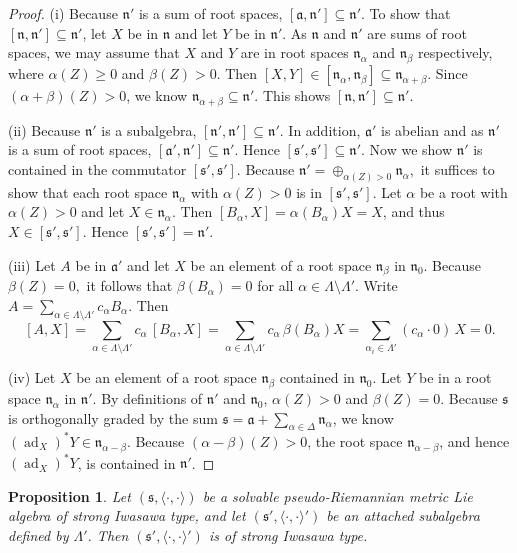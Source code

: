 \documentclass[12pt]{amsart}
\newcommand{\fraka}{\ensuremath{\mathfrak{a}} }
\newcommand{\frakn}{\ensuremath{\mathfrak{n}} }
\newcommand{\fraks}{\ensuremath{\mathfrak{s}} }
\renewcommand\a{{\mathfrak{a}}}
\newcommand\n{{\mathfrak{n}}}
\newcommand\s{{\mathfrak{s}}}
\newcommand\ip{{\langle\cdot {,} \cdot\rangle}}
\newcommand\ad{\operatorname{ad}}
\theoremstyle{plain}
\newtheorem{prop}[theorem]{Proposition}
\theoremstyle{definition}
\theoremstyle{remark}
\numberwithin{equation}{section}
\numberwithin{theorem}{section}
\begin{document}
\begin{proof}
(i) Because  $\frakn'$ is
a sum of root spaces, $[\a,\n']\subseteq \n'$. To show that
$[\n,\n']\subseteq \n'$, let $X$ be in $\frakn$ and let $Y$ be in
$\frakn'$.  As $\frakn$ and $\frakn'$ are sums of root spaces, we may
assume  that $X$ and $Y$ are in root spaces
$\n_{\alpha}$ and $\n_{\beta}$ respectively, where $\alpha(Z)\geq 0$ and $\beta(Z)>0$. 
 Then $[X,Y] \in [\frakn_\alpha, \frakn_\beta]
\subseteq \frakn_{\alpha+\beta}$.
Since $(\alpha+\beta)(Z)>0$, we know 
$\frakn_{\alpha+\beta} \subseteq \frakn'$. This shows $[\n,\n']\subseteq \n'$.

(ii) Because $\frakn'$ is a
subalgebra,  $[\n',\n']\subseteq \frakn'$. In addition, $\fraka'$ is abelian and as $\frakn'$ is a sum of root spaces, $[\fraka',\frakn'] \subseteq \frakn'$.
Hence $[\s',\s'] \subseteq \frakn'$.
Now we show $\n'$ is contained in the commutator $[\fraks',\fraks']$. Because
$\n' = \oplus_{\alpha(Z)>0} \frakn_\alpha,$ it suffices to show that each root space
$\n_{\alpha}$ with $\alpha(Z) >0$ is in $[\fraks',\fraks']$.  Let
$\alpha$ be a root with $\alpha(Z)>0$ and let $X\in \n_\alpha$.  Then
$[B_\alpha,X] =\alpha(B_\alpha)X =X$, 
and
thus $X \in [\s',\s']$. 
Hence $[\fraks', \fraks'] = \frakn'$. 

(iii) Let $A$ be in $\fraka'$ and let $X$ be an
element of a root space $\n_{\beta}$ in $\n_0$. Because $\beta(Z)=0,$ it follows that $\beta(B_\alpha)=0$ for all $\alpha \in \Lambda \setminus \Lambda'.$  Write  $A =\sum_{\alpha \in \Lambda \setminus \Lambda'} c_{\alpha} B_{\alpha}$. Then 
\[ [A, X] =  \sum_{\alpha \in \Lambda \setminus \Lambda'} c_{\alpha} \, [B_{\alpha}, X ] = \sum_{\alpha \in \Lambda \setminus\Lambda'}  c_{\alpha} \, \beta(B_{\alpha})X = \sum_{\alpha_i \in \Lambda'}  (c_{\alpha} \cdot 0) \, X =0. \]

(iv) Let $X$ be an element of a root space $\n_{\beta}$ contained in $\n_0$. Let $Y$ be in a root space $\n_{\alpha}$ in $\n'$.  By definitions of $\frakn'$ and $\frakn_0$, $\alpha(Z)>0$  and $\beta(Z) = 0$.  
Because $\fraks$ is orthogonally graded by the sum $\fraks = \fraka + \sum_{\alpha \in \Delta} \n_{\alpha}$, 
we know $(\ad_X)^* Y \in \n_{\alpha - \beta}$. 
Because $(\alpha - \beta)(Z)>0$,  the  root space  $\n_{\alpha - \beta}$, and hence $(\ad_X)^* Y$, is contained in $ \n'$.
\end{proof}

\begin{prop}\label{prop: sprime}
Let $(\fraks,\ip)$ be a solvable pseudo-Riemannian metric Lie algebra of strong Iwasawa type, and let  $(\s', \ip')$ be an attached subalgebra defined by 
$\Lambda'$.  
Then  $(\s', \ip')$ is  of strong Iwasawa type.  
\end{prop}
\end{document}
